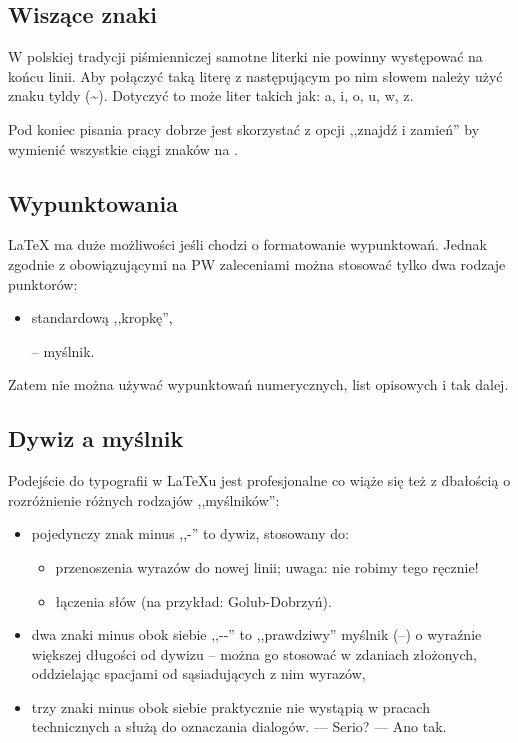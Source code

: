 \subsection{Wiszące znaki}
W polskiej tradycji piśmienniczej samotne literki nie powinny występować na końcu linii. Aby połączyć taką literę z następującym po nim słowem należy użyć znaku tyldy (\textasciitilde{}). Dotyczyć to może liter takich jak: a, i, o, u, w, z.

Pod koniec pisania pracy dobrze jest skorzystać z opcji ,,znajdź i zamień'' by wymienić wszystkie ciągi znaków  na .


\subsection{Wypunktowania}
\LaTeX{} ma duże możliwości jeśli chodzi o formatowanie wypunktowań. Jednak zgodnie z obowiązującymi na PW zaleceniami można stosować tylko dwa rodzaje punktorów:
\begin{itemize}
    \item standardową ,,kropkę'',
    \item[--] myślnik.
\end{itemize}
Zatem nie można używać wypunktowań numerycznych, list opisowych i tak dalej.


\subsection{Dywiz a myślnik}
Podejście do typografii w \LaTeX{u} jest profesjonalne co wiąże się też z dbałością o rozróżnienie różnych rodzajów ,,myślników'':
\begin{itemize}
    \item pojedynczy znak minus ,,-'' to dywiz, stosowany do:
    \begin{itemize}
        \item przenoszenia wyrazów do nowej linii; uwaga: nie robimy tego ręcznie!
        \item łączenia słów (na przykład: Golub-Dobrzyń).
    \end{itemize}
    \item dwa znaki minus obok siebie ,,-{}-'' %
    to ,,prawdziwy'' myślnik (--) o wyraźnie większej długości od dywizu -- można go stosować w zdaniach złożonych, oddzielając spacjami od sąsiadujących z nim wyrazów,
    \item trzy znaki minus obok siebie praktycznie nie wystąpią w pracach technicznych a służą do oznaczania dialogów. --- Serio? --- Ano tak.
\end{itemize}


